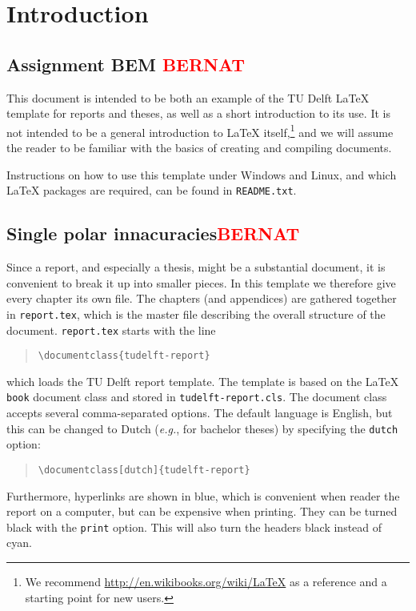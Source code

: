 \chapter{Introduction}

\section{Assignment BEM \textcolor{red}{BERNAT}}

This document is intended to be both an example of the TU Delft \LaTeX{} template for reports and theses, as well as a short introduction to its use. It is not intended to be a general introduction to \LaTeX{} itself,\footnote{We recommend \url{http://en.wikibooks.org/wiki/LaTeX} as a reference and a starting point for new users.} and we will assume the reader to be familiar with the basics of creating and compiling documents.

Instructions on how to use this template under Windows and Linux, and which \LaTeX{} packages are required, can be found in \texttt{README.txt}.

\section{Single polar innacuracies\textcolor{red}{BERNAT}}

Since a report, and especially a thesis, might be a substantial document, it is convenient to break it up into smaller pieces. In this template we therefore give every chapter its own file. The chapters (and appendices) are gathered together in \texttt{report.tex}, which is the master file describing the overall structure of the document. \texttt{report.tex} starts with the line
\begin{quote}
    \texttt{\textbackslash documentclass\{tudelft-report\}}
\end{quote}
which loads the TU Delft report template. The template is based on the \LaTeX{} \texttt{book} document class and stored in \texttt{tudelft-report.cls}. The document class accepts several comma-separated options. The default language is English, but this can be changed to Dutch (\emph{e.g.}, for bachelor theses) by specifying the \texttt{dutch} option:
\begin{quote}
    \texttt{\textbackslash documentclass[dutch]\{tudelft-report\}}
\end{quote}
Furthermore, hyperlinks are shown in blue, which is convenient when reader the report on a computer, but can be expensive when printing. They can be turned black with the \texttt{print} option. This will also turn the headers black instead of cyan.

